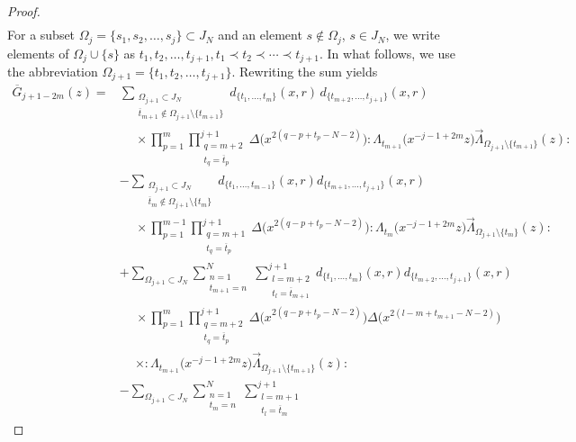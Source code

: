 \documentclass[pdftex]{sigma}
\numberwithin{equation}{section}
\begin{document}
\begin{proof}
\begin{align*}
\end{align*}
For a subset $\Omega_j=\{s_1, s_2, \dots, s_j\}\subset J_N$ and an element $s \notin \Omega_j$,
$s \in J_N$, we write elements of $\Omega_j \cup \{s\}$ as
$t_1, t_2, \dots, t_{j+1}, t_1 \prec t_2 \prec \cdots \prec t_{j+1}$.
In what follows, we use the abbreviation
$\Omega_{j+1}=\{t_1, t_2, \dots, t_{j+1}\}$.
Rewriting the sum yields
\begin{align*}
\overline{G}_{j+1-2m}(z)={}&
\sum\limits_{\substack{{\Omega}_{j+1} \subset J_N
\\ \overline{t}_{m+1} \notin {\Omega}_{j+1}
\setminus \{t_{m+1}\}}}
d_{\{t_1, \dots, t_m\}}(x,r)\,
d_{\{t_{m+2}, \dots, t_{j+1}\}}(x,r)
\\ \qquad
&\phantom{-}\times \prod_{p=1}^m\prod\limits_{\substack{q=m+2 \\t_q=\overline{t}_p}}^{j+1}
\Delta\big(x^{2(q-p+t_p-N-2)}\big){:}\Lambda_{t_{m+1}}\big(x^{-j-1+2m}z\big)
\overrightarrow{\Lambda}_{{\Omega}_{j+1}
\setminus \{t_{m+1}\}}(z){:}
\\
&-\sum\limits_{\substack{\Omega_{j+1}\subset J_N
\\ \overline{t}_m \notin \Omega_{j+1} \setminus \{t_m\}}}
d_{\{t_1,\dots, t_{m-1}\}}(x,r) d_{\{t_{m+1}, \dots, t_{j+1}\}}(x,r)
\\
&\phantom{-}\times \prod_{p=1}^{m-1}\prod\limits_{\substack{q=m+1\\t_q=\overline{t}_p}}^{j+1}
\Delta\big(x^{2(q-p+t_p-N-2)}\big){:}\Lambda_{t_{m}}\big(x^{-j-1+2m}z\big)
\overrightarrow{\Lambda}_{\Omega_{j+1}\setminus \{t_{m}\}}(z){:}
\\
&+\sum_{\Omega_{j+1} \subset J_N}
\sum\limits_{\substack{n=1\\ t_{m+1}=n}}^N
\sum\limits_{\substack{l=m+2\\ t_l=\overline{t}_{m+1}}}^{j+1}
d_{\{t_1,\dots, t_m\}}(x,r) d_{\{t_{m+2}, \dots, t_{j+1}\}}(x,r)
\\
&\phantom{-}\times \prod_{p=1}^m\prod\limits_{\substack{q=m+2\\t_q=\overline{t}_p}}^{j+1}
\Delta\big(x^{2(q-p+t_p-N-2)}\big)\Delta\big(x^{2(l-m+t_{m+1}-N-2)}\big)
\\
&\phantom{-}\times {:}\Lambda_{t_{m+1}}\big(x^{-j-1+2m}z\big)
\overrightarrow{\Lambda}_{\Omega_{j+1}\setminus \{t_{m+1}\}}(z){:}
\\
&-\sum_{\Omega_{j+1}\subset J_N}
\sum\limits_{\substack{n=1\\t_m=n}}^N
\sum\limits_{\substack{l=m+1\\t_l=\overline{t}_m}}^{j+1}

\end{align*}
\end{proof}
\end{document}
